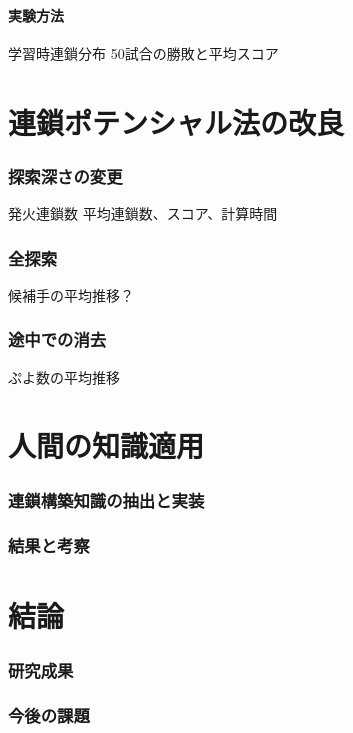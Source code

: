 \documentclass[12pt]{jsarticle}
\begin{document}
\subsection{実験方法}

学習時連鎖分布
50試合の勝敗と平均スコア

\part{連鎖ポテンシャル法の改良} \setcounter{section}{0}
\section{探索深さの変更}
発火連鎖数
平均連鎖数、スコア、計算時間

\section{全探索}
候補手の平均推移？

\section{途中での消去}
ぷよ数の平均推移



\part{人間の知識適用} \setcounter{section}{0}
\section{連鎖構築知識の抽出と実装}
\section{結果と考察}

\part{結論} \setcounter{section}{0}
\section{研究成果}
\section{今後の課題}

\newpage


\end{document}
